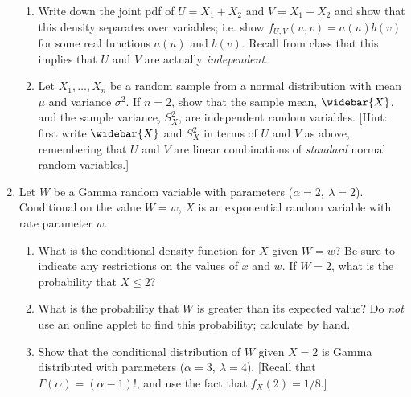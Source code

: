 \documentclass[11pt]{article}
\begin{document}
\begin{enumerate}[label=\textbf{Question \arabic*:},start=1]
\begin{enumerate}
  \item Write down the joint pdf of $U = X_1 + X_2$ and $V = X_1 - X_2$ and show that this density separates over variables; i.e. show $f_{U,V}(u,v) = a(u)b(v)$ for some real functions $a(u)$ and $b(v)$. Recall from class that this implies that $U$ and $V$ are actually {\em independent}. \\

  \item Let $X_1,\ldots,X_n$ be a random sample from a normal distribution with mean $\mu$ and variance $\sigma^2$. If $n=2$, show that the sample mean, $\widebar{X}$, and the sample variance, $S_X^2$, are independent random variables. [Hint: first write $\widebar{X}$ and $S_X^2$ in terms of $U$ and $V$ as above, remembering that $U$ and $V$ are linear combinations of {\em standard} normal random variables.]
\end{enumerate}




\vspace*{3mm}

\item Let $W$ be a Gamma random variable with parameters ($\alpha = 2,\ \lambda = 2$). Conditional on the value $W = w$, $X$ is an exponential random variable with rate parameter $w$.
\begin{enumerate}
\item What is the conditional density function for $X$ given $W = w$? Be sure to indicate any restrictions on the values of $x$ and $w$. If $W=2$, what is the probability that $X\leq 2$?\\

\item What is the probability that $W$ is greater than its expected value? Do {\em not} use an online applet to find this probability; calculate by hand.\\

\item Show that the conditional distribution of $W$ given $X=2$ is Gamma distributed with parameters ($\alpha=3,\ \lambda=4$). [Recall that $\Gamma(\alpha) = (\alpha-1)!$, and use the fact that $f_X(2) = 1/8$.]\\
\end{enumerate}





\end{enumerate}
\end{document}
